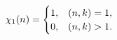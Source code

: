 \[\mathop{\chi_{1}\/}\nolimits\!\left(n\right)=\begin{cases}1,&\left(n,k\right)=%
1,\\
0,&\left(n,k\right)>1.\end{cases}\]